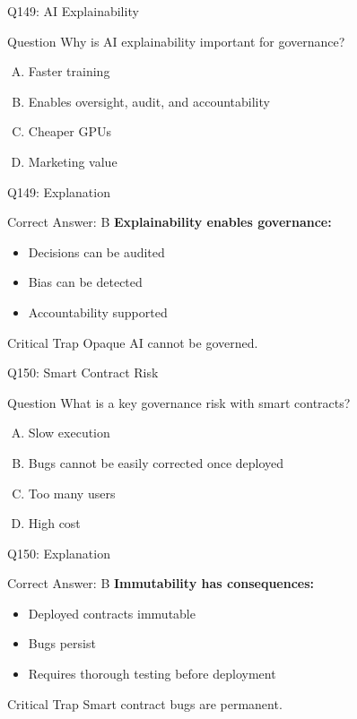 \documentclass{beamer}
\begin{document}
	\begin{frame}{Q149: AI Explainability}
		\begin{block}{Question}
			Why is AI explainability important for governance?
		\end{block}
		\begin{enumerate}[(A)]
			\item Faster training
			\item Enables oversight, audit, and accountability
			\item Cheaper GPUs
			\item Marketing value
		\end{enumerate}
	\end{frame}
	
	\begin{frame}{Q149: Explanation}
		\begin{block}{Correct Answer: B}
			\textbf{Explainability enables governance:}
			\begin{itemize}
				\item Decisions can be audited
				\item Bias can be detected
				\item Accountability supported
			\end{itemize}
		\end{block}
		\begin{alertblock}{Critical Trap}
			Opaque AI cannot be governed.
		\end{alertblock}
	\end{frame}
	
	\begin{frame}{Q150: Smart Contract Risk}
		\begin{block}{Question}
			What is a key governance risk with smart contracts?
		\end{block}
		\begin{enumerate}[(A)]
			\item Slow execution
			\item Bugs cannot be easily corrected once deployed
			\item Too many users
			\item High cost
		\end{enumerate}
	\end{frame}
	
	\begin{frame}{Q150: Explanation}
		\begin{block}{Correct Answer: B}
			\textbf{Immutability has consequences:}
			\begin{itemize}
				\item Deployed contracts immutable
				\item Bugs persist
				\item Requires thorough testing before deployment
			\end{itemize}
		\end{block}
		\begin{alertblock}{Critical Trap}
			Smart contract bugs are permanent.
		\end{alertblock}
	\end{frame}
	
\end{document}
